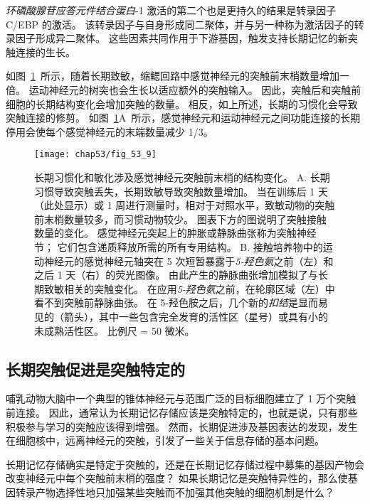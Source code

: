 \textit{环磷酸腺苷应答元件结合蛋白}-1 激活的第二个也是更持久的结果是转录因子 C/EBP 的激活。
该转录因子与自身形成同二聚体，并与另一种称为激活因子的转录因子形成异二聚体。
这些因素共同作用于下游基因，触发支持长期记忆的新突触连接的生长。


如图~\ref{fig:53_9}~所示，随着长期致敏，缩鳃回路中感觉神经元的突触前末梢数量增加一倍。
运动神经元的树突也会生长以适应额外的突触输入。
因此，突触后和突触前细胞的长期结构变化会增加突触的数量。
相反，如上所述，长期的习惯化会导致突触连接的修剪。
如图~\ref{fig:53_9}A~所示，感觉神经元和运动神经元之间功能连接的长期停用会使每个感觉神经元的末端数量减少 1/3。


\begin{figure}[htbp]
	\centering
	\texttt{[image: chap53/fig\_53\_9]}
	\caption{长期习惯化和敏化涉及感觉神经元突触前末梢的结构变化。
		A. 长期习惯导致突触丢失，长期致敏导致突触数量增加。
		当在训练后 1 天（此处显示）或 1 周进行测量时，相对于对照水平，致敏动物的突触前末梢数量较多，而习惯动物较少。
		图表下方的图说明了突触接触数量的变化。
		感觉神经元突起上的肿胀或静脉曲张称为突触神经节；
		它们包含递质释放所需的所有专用结构\cite{bailey1983morphological}。
		B. 接触培养物中的运动神经元的感觉神经元轴突在 5 次短暂暴露于\textit{5-羟色氨}之前（左）和之后 1 天（右）的荧光图像。
		由此产生的静脉曲张增加模拟了与长期致敏相关的突触变化。
		在应用\textit{5-羟色氨}之前，在轮廓区域（左）中看不到突触前静脉曲张。
		在 5-羟色胺之后，几个新的\textit{扣结}是显而易见的（箭头），其中一些包含完全发育的活性区（星号）或具有小的未成熟活性区。
		比例尺 = 50 微米\cite{glanzman1990target}。}
	\label{fig:53_9}
\end{figure}



\subsection{长期突触促进是突触特定的}

哺乳动物大脑中一个典型的锥体神经元与范围广泛的目标细胞建立了 1 万个突触前连接。
因此，通常认为长期记忆存储应该是突触特定的，也就是说，只有那些积极参与学习的突触应该得到增强。
然而，长期促进涉及基因表达的发现，发生在细胞核中，远离神经元的突触，引发了一些关于信息存储的基本问题。


长期记忆存储确实是特定于突触的，还是在长期记忆存储过程中募集的基因产物会改变神经元中每个突触前末梢的强度？
如果长期记忆是突触特异性的，那么使基因转录产物选择性地只加强某些突触而不加强其他突触的细胞机制是什么？


